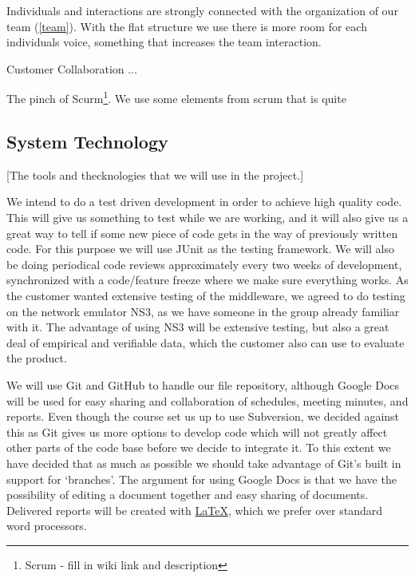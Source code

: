 \documentclass[12pt]{article}
\begin{document}
    Individuals and interactions are strongly connected with the organization of our team (\ref{team}). With the flat structure we use there is more room for each individuals voice, something that increases the team interaction. 
    
    Customer Collaboration ...
    
    The pinch of Scurm\footnote
        {Scrum - fill in wiki link and description}. 
    We use some elements from scrum that is quite 



    \subsection{System Technology}\label{tools} [The tools and thecknologies that we will use in the project.]
    
    We  intend to do a test driven development in order to achieve high quality code. This will give us something to test while we are working, and it will also give us a great way to tell if some new piece of code gets in the way of previously written code. For this purpose we will use JUnit as the testing framework. We will also be doing periodical code reviews approximately every two weeks of development, synchronized with a code/feature freeze where we make sure everything works. As the customer wanted extensive testing of the middleware, we agreed to do testing on the network emulator NS3, as we have someone in the group already familiar with it. The advantage of using NS3 will be extensive testing, but also a great deal of empirical and verifiable data, which the customer also can use to evaluate the product.

    We will use Git and GitHub to handle our file repository, although Google Docs will be used for easy sharing and collaboration of schedules, meeting minutes, and reports. Even though the course set us up to use Subversion, we decided against this as Git gives us more options to develop code which will not greatly affect other parts of the code base before we decide to integrate it. To this extent we have decided that as much as possible we should take advantage of Git’s built in support for ‘branches’. The argument for using Google Docs is that we have the possibility of editing a document together and easy sharing of documents. Delivered reports will be created with \href{http://www.latex-project.org/}{\LaTeX}, which we prefer over standard word processors.
\end{document}
